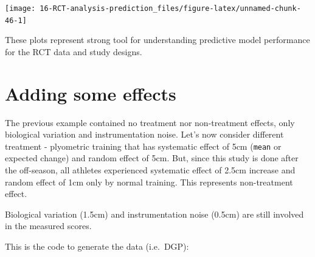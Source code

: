 \documentclass[
]{book}
\begin{document}
\begin{center}\texttt{[image: 16-RCT-analysis-prediction\_files/figure-latex/unnamed-chunk-46-1]} \end{center}

These plots represent strong tool for understanding predictive model performance for the RCT data and study designs.

\hypertarget{adding-some-effects}{%
\section{Adding some effects}\label{adding-some-effects}}

The previous example contained no treatment nor non-treatment effects, only biological variation and instrumentation noise. Let's now consider different treatment - plyometric training that has systematic effect of 5cm (\texttt{mean} or expected change) and random effect of 5cm. But, since this study is done after the off-season, all athletes experienced systematic effect of 2.5cm increase and random effect of 1cm only by normal training. This represents non-treatment effect.

Biological variation (1.5cm) and instrumentation noise (0.5cm) are still involved in the measured scores.

This is the code to generate the data (i.e.~DGP):
\end{document}
